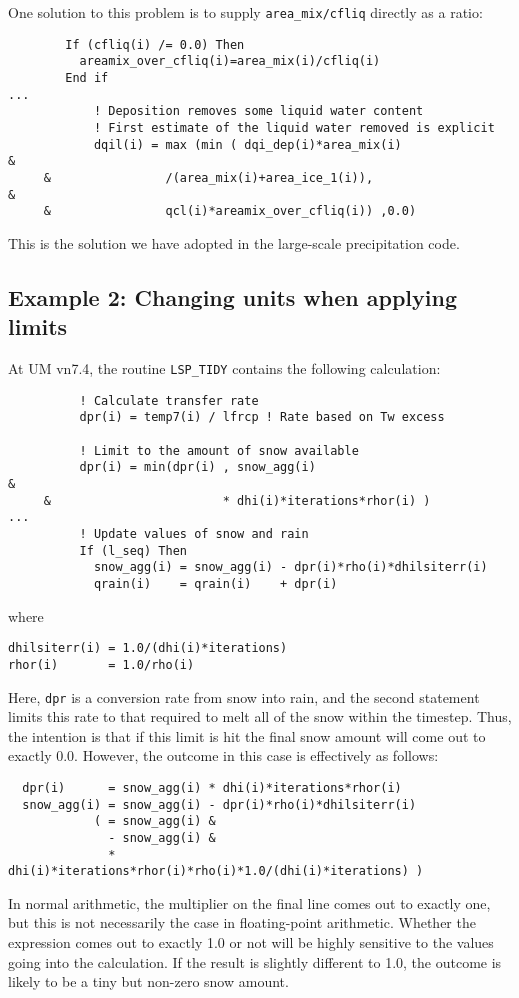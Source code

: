 One solution to this problem is to supply \verb|area_mix/cfliq| 
directly as a ratio:
\begin{verbatim}
        If (cfliq(i) /= 0.0) Then
          areamix_over_cfliq(i)=area_mix(i)/cfliq(i)
        End if
...
            ! Deposition removes some liquid water content
            ! First estimate of the liquid water removed is explicit
            dqil(i) = max (min ( dqi_dep(i)*area_mix(i)                 &
     &                /(area_mix(i)+area_ice_1(i)),                     &
     &                qcl(i)*areamix_over_cfliq(i)) ,0.0)

\end{verbatim}
This is the solution we have adopted in the large-scale precipitation code.

\subsection{Example 2: Changing units when applying limits}
At UM vn7.4, the routine \verb|LSP_TIDY| contains the following calculation:
\begin{verbatim}
          ! Calculate transfer rate
          dpr(i) = temp7(i) / lfrcp ! Rate based on Tw excess

          ! Limit to the amount of snow available
          dpr(i) = min(dpr(i) , snow_agg(i)                             &
     &                        * dhi(i)*iterations*rhor(i) )
...
          ! Update values of snow and rain
          If (l_seq) Then
            snow_agg(i) = snow_agg(i) - dpr(i)*rho(i)*dhilsiterr(i)
            qrain(i)    = qrain(i)    + dpr(i)
\end{verbatim}
where
\begin{verbatim}
dhilsiterr(i) = 1.0/(dhi(i)*iterations)
rhor(i)       = 1.0/rho(i)
\end{verbatim}
Here, \verb|dpr| 
is a conversion rate from snow into rain, 
and the second statement limits this rate to that required to 
melt all of the snow within the timestep. 
Thus, the intention is that if this limit is hit the 
final snow amount will come out to exactly 0.0. 
However, the outcome in this case is effectively as follows:
\begin{verbatim}
  dpr(i)      = snow_agg(i) * dhi(i)*iterations*rhor(i)
  snow_agg(i) = snow_agg(i) - dpr(i)*rho(i)*dhilsiterr(i)
            ( = snow_agg(i) &
              - snow_agg(i) &
              * dhi(i)*iterations*rhor(i)*rho(i)*1.0/(dhi(i)*iterations) )
\end{verbatim}
In normal arithmetic, the multiplier on the final line comes out to 
exactly one, but this is not necessarily the case in 
floating-point arithmetic. Whether the expression comes out to exactly 
1.0 or not will be highly sensitive to the values going into the 
calculation. If the result is slightly different to 1.0, 
the outcome is likely to be a tiny but non-zero snow amount.

